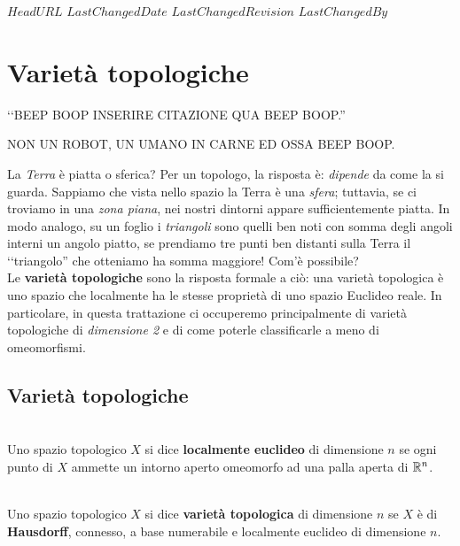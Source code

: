 \svnidlong
{$HeadURL$}
{$LastChangedDate$}
{$LastChangedRevision$}
{$LastChangedBy$}

\chapter{Varietà topologiche}

\begin{introduction}
	‘‘BEEP BOOP INSERIRE CITAZIONE QUA BEEP BOOP.''
	\begin{flushright}
		\textsc{NON UN ROBOT,} UN UMANO IN CARNE ED OSSA BEEP BOOP.
	\end{flushright}
\end{introduction}

\noindent La \textit{Terra} è piatta o sferica? Per un topologo, la risposta è: \textit{dipende} da come la si guarda. Sappiamo che vista nello spazio la Terra è una \textit{sfera}; tuttavia, se ci troviamo in una \textit{zona piana}, nei nostri dintorni appare sufficientemente piatta. In modo analogo, su un foglio i \textit{triangoli} sono quelli ben noti con somma degli angoli interni un angolo piatto, se prendiamo tre punti ben distanti sulla Terra il ‘‘triangolo'' che otteniamo ha somma maggiore! Com'è possibile?\\
Le \textbf{varietà topologiche} sono la risposta formale a ciò: una varietà topologica è uno spazio che localmente ha le stesse proprietà di uno spazio Euclideo reale. In particolare, in questa trattazione ci occuperemo principalmente di varietà topologiche di \textit{dimensione 2} e di come poterle classificarle a meno di omeomorfismi.
\section{Varietà topologiche}
\begin{define}~{}\\
	Uno spazio topologico $X$ si dice \textbf{localmente euclideo} di dimensione $n$ se ogni punto di $X$ ammette un intorno aperto omeomorfo ad una palla aperta di $\mathbb{R}^n$.
\end{define}

\begin{define}~{}\\
	Uno spazio topologico $X$ si dice \textbf{varietà topologica} di dimensione $n$ se $X$ è di \textbf{Hausdorff}, connesso, a base numerabile e localmente euclideo di dimensione $n$.
\end{define}

